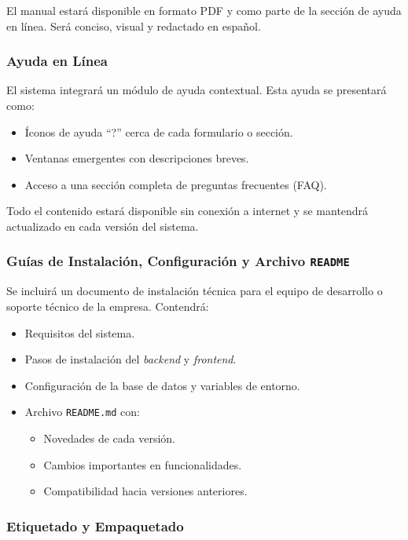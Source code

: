 El manual estará disponible en formato PDF y como parte de la sección de ayuda en línea. Será conciso, visual y redactado en español.

\subsubsection*{Ayuda en Línea}

El sistema integrará un módulo de ayuda contextual. Esta ayuda se presentará como:

\begin{itemize}
	\item Íconos de ayuda ``?'' cerca de cada formulario o sección.
	\item Ventanas emergentes con descripciones breves.
	\item Acceso a una sección completa de preguntas frecuentes (FAQ).
\end{itemize}

Todo el contenido estará disponible sin conexión a internet y se mantendrá actualizado en cada versión del sistema.

\subsubsection*{Guías de Instalación, Configuración y Archivo \texttt{README}}

Se incluirá un documento de instalación técnica para el equipo de desarrollo o soporte técnico de la empresa. Contendrá:

\begin{itemize}
	\item Requisitos del sistema.
	\item Pasos de instalación del \textit{backend} y \textit{frontend}.
	\item Configuración de la base de datos y variables de entorno.
	\item Archivo \texttt{README.md} con:
	      \begin{itemize}
		      \item Novedades de cada versión.
		      \item Cambios importantes en funcionalidades.
		      \item Compatibilidad hacia versiones anteriores.
	      \end{itemize}
\end{itemize}

\subsubsection*{Etiquetado y Empaquetado}

